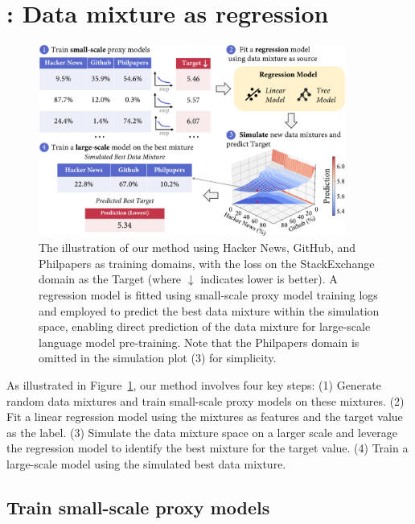 \section{\ourmethod: Data mixture as regression}

\begin{figure}[t]
    \vspace{-0.2cm}
    \centering
    \includegraphics[width=0.9\textwidth]{figures/data_mixture_method_v9.pdf}
    \caption{The illustration of our method using Hacker News, GitHub, and Philpapers as training domains, with the loss on the StackExchange domain as the Target (where $\downarrow$ indicates lower is better). A regression model is fitted using small-scale proxy model training logs and employed to predict the best data mixture within the simulation space, enabling direct prediction of the data mixture for large-scale language model pre-training. Note that the Philpapers domain is omitted in the simulation plot (3) for simplicity.}
    \label{fig:method_overview}
    \vspace{-5mm}
\end{figure}

As illustrated in Figure~\ref{fig:method_overview}, our method involves four key steps: (1) Generate random data mixtures and train small-scale proxy models on these mixtures. (2) Fit a linear regression model using the mixtures as features and the target value as the label. (3) Simulate the data mixture space on a larger scale and leverage the regression model to identify the best mixture for the target value. (4) Train a large-scale model using the simulated best data mixture.

\subsection{Train small-scale proxy models}


